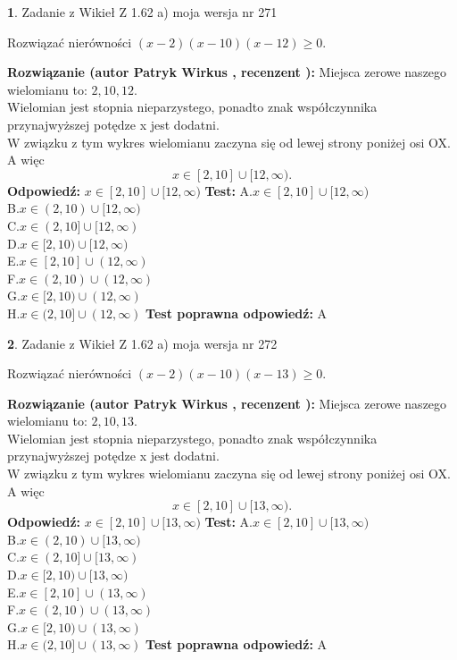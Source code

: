 \documentclass[12pt, a4paper]{article}
\theoremstyle{definition} %
\newtheorem{zad}{}
\newcommand{\zadStart}[1]{\begin{zad}#1\newline}
\newcommand{\zadStop}{\end{zad}}
\newcommand{\rozwStart}[2]{\noindent \textbf{Rozwiązanie (autor #1 , recenzent #2): }\newline}
\newcommand{\rozwStop}{\newline}
\newcommand{\odpStart}{\noindent \textbf{Odpowiedź:}\newline}
\newcommand{\odpStop}{\newline}
\newcommand{\testStart}{\noindent \textbf{Test:}\newline}
\newcommand{\testStop}{\newline}
\newcommand{\kluczStart}{\noindent \textbf{Test poprawna odpowiedź:}\newline}
\newcommand{\kluczStop}{\newline}
\begin{document}
\zadStart{Zadanie z Wikieł Z 1.62 a) moja wersja nr 271}

Rozwiązać nierówności $(x-2)(x-10)(x-12)\ge0$.
\zadStop
\rozwStart{Patryk Wirkus}{}
Miejsca zerowe naszego wielomianu to: $2, 10, 12$.\\
Wielomian jest stopnia nieparzystego, ponadto znak współczynnika przy\linebreak najwyższej potędze x jest dodatni.\\ W związku z tym wykres wielomianu zaczyna się od lewej strony poniżej osi OX. A więc $$x \in [2,10] \cup [12,\infty).$$
\rozwStop
\odpStart
$x \in [2,10] \cup [12,\infty)$
\odpStop
\testStart
A.$x \in [2,10] \cup [12,\infty)$\\
B.$x \in (2,10) \cup [12,\infty)$\\
C.$x \in (2,10] \cup [12,\infty)$\\
D.$x \in [2,10) \cup [12,\infty)$\\
E.$x \in [2,10] \cup (12,\infty)$\\
F.$x \in (2,10) \cup (12,\infty)$\\
G.$x \in [2,10) \cup (12,\infty)$\\
H.$x \in (2,10] \cup (12,\infty)$
\testStop
\kluczStart
A
\kluczStop



\zadStart{Zadanie z Wikieł Z 1.62 a) moja wersja nr 272}

Rozwiązać nierówności $(x-2)(x-10)(x-13)\ge0$.
\zadStop
\rozwStart{Patryk Wirkus}{}
Miejsca zerowe naszego wielomianu to: $2, 10, 13$.\\
Wielomian jest stopnia nieparzystego, ponadto znak współczynnika przy\linebreak najwyższej potędze x jest dodatni.\\ W związku z tym wykres wielomianu zaczyna się od lewej strony poniżej osi OX. A więc $$x \in [2,10] \cup [13,\infty).$$
\rozwStop
\odpStart
$x \in [2,10] \cup [13,\infty)$
\odpStop
\testStart
A.$x \in [2,10] \cup [13,\infty)$\\
B.$x \in (2,10) \cup [13,\infty)$\\
C.$x \in (2,10] \cup [13,\infty)$\\
D.$x \in [2,10) \cup [13,\infty)$\\
E.$x \in [2,10] \cup (13,\infty)$\\
F.$x \in (2,10) \cup (13,\infty)$\\
G.$x \in [2,10) \cup (13,\infty)$\\
H.$x \in (2,10] \cup (13,\infty)$
\testStop
\kluczStart
A
\kluczStop
\end{document}

